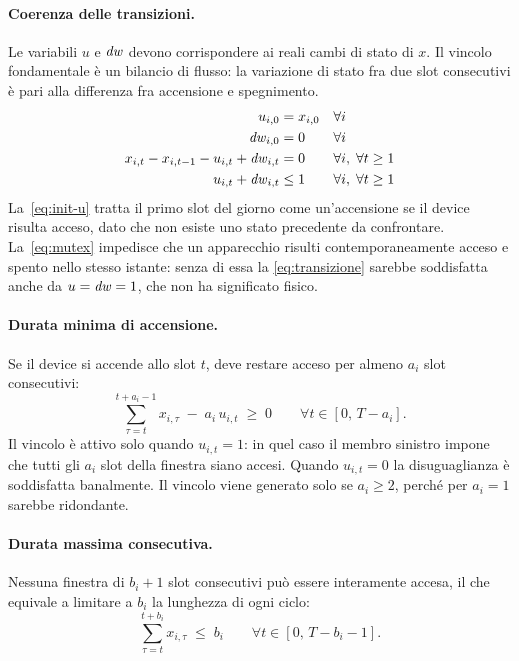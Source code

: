 \paragraph{Coerenza delle transizioni.} Le variabili $u$ e $\mathit{dw}$ devono corrispondere ai reali
cambi di stato di $x$. Il vincolo fondamentale è un bilancio di flusso: la variazione di stato fra
due slot consecutivi è pari alla differenza fra accensione e spegnimento.
\begin{align}
  u_{i,0} &= x_{i,0} && \forall i \label{eq:init-u}\\
  \mathit{dw}_{i,0} &= 0 && \forall i \label{eq:init-dw}\\
  x_{i,t} - x_{i,t-1} - u_{i,t} + \mathit{dw}_{i,t} &= 0 && \forall i,\; \forall t \ge 1 \label{eq:transizione}\\
  u_{i,t} + \mathit{dw}_{i,t} &\le 1 && \forall i,\; \forall t \ge 1 \label{eq:mutex}
\end{align}
La~\eqref{eq:init-u} tratta il primo slot del giorno come un'accensione se il device risulta
acceso, dato che non esiste uno stato precedente da confrontare. La~\eqref{eq:mutex} impedisce che
un apparecchio risulti contemporaneamente acceso e spento nello stesso istante: senza di essa la
\eqref{eq:transizione} sarebbe soddisfatta anche da $u = \mathit{dw} = 1$, che non ha significato fisico.

\paragraph{Durata minima di accensione.} Se il device si accende allo slot $t$, deve restare acceso
per almeno $a_i$ slot consecutivi:
\begin{equation}
  \sum_{\tau=t}^{t+a_i-1} x_{i,\tau} \;-\; a_i \, u_{i,t} \;\ge\; 0
  \qquad \forall t \in [0,\, T-a_i].
  \label{eq:durata-min}
\end{equation}
Il vincolo è attivo solo quando $u_{i,t} = 1$: in quel caso il membro sinistro impone che tutti gli
$a_i$ slot della finestra siano accesi. Quando $u_{i,t} = 0$ la disuguaglianza è soddisfatta
banalmente. Il vincolo viene generato solo se $a_i \ge 2$, perché per $a_i = 1$ sarebbe
ridondante.

\paragraph{Durata massima consecutiva.} Nessuna finestra di $b_i + 1$ slot consecutivi può essere
interamente accesa, il che equivale a limitare a $b_i$ la lunghezza di ogni ciclo:
\begin{equation}
  \sum_{\tau=t}^{t+b_i} x_{i,\tau} \;\le\; b_i
  \qquad \forall t \in [0,\, T-b_i-1].
  \label{eq:durata-max}
\end{equation}

